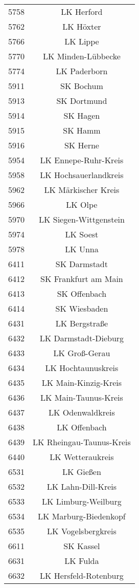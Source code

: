 \begin{tabular}{c c}
    5758&LK Herford\\ 
    5762&LK Höxter\\ 
    5766&LK Lippe\\ 
    5770&LK Minden-Lübbecke\\ 
    5774&LK Paderborn\\ 
    5911&SK Bochum\\ 
    5913&SK Dortmund\\ 
    5914&SK Hagen\\ 
    5915&SK Hamm\\ 
    5916&SK Herne\\ 
    5954&LK Ennepe-Ruhr-Kreis\\ 
    5958&LK Hochsauerlandkreis\\ 
    5962&LK Märkischer Kreis\\ 
    5966&LK Olpe\\ 
    5970&LK Siegen-Wittgenstein\\ 
    5974&LK Soest\\ 
    5978&LK Unna\\ 
    6411&SK Darmstadt\\ 
    6412&SK Frankfurt am Main\\ 
    6413&SK Offenbach\\ 
    6414&SK Wiesbaden\\ 
    6431&LK Bergstraße\\ 
    6432&LK Darmstadt-Dieburg\\ 
    6433&LK Groß-Gerau\\ 
    6434&LK Hochtaunuskreis\\ 
    6435&LK Main-Kinzig-Kreis\\ 
    6436&LK Main-Taunus-Kreis\\ 
    6437&LK Odenwaldkreis\\ 
    6438&LK Offenbach\\ 
    6439&LK Rheingau-Taunus-Kreis\\ 
    6440&LK Wetteraukreis\\ 
    6531&LK Gießen\\ 
    6532&LK Lahn-Dill-Kreis\\ 
    6533&LK Limburg-Weilburg\\ 
    6534&LK Marburg-Biedenkopf\\ 
    6535&LK Vogelsbergkreis\\ 
    6611&SK Kassel\\ 
    6631&LK Fulda\\ 
    6632&LK Hersfeld-Rotenburg\\ 

\end{tabular}
